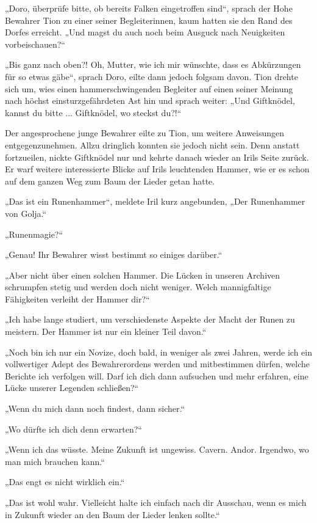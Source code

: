 „Doro, überprüfe bitte, ob bereits Falken eingetroffen sind“, sprach der Hohe Bewahrer Tion zu einer seiner Begleiterinnen, kaum hatten sie den Rand des Dorfes erreicht. „Und magst du auch noch beim Ausguck nach Neuigkeiten vorbeischauen?“

„Bis ganz nach oben?! Oh, Mutter, wie ich mir wünschte, dass es Abkürzungen für so etwas gäbe“, sprach Doro, eilte dann jedoch folgsam davon. Tion drehte sich um, wies einen hammerschwingenden Begleiter auf einen seiner Meinung nach höchst einsturzgefährdeten Ast hin und sprach weiter: „Und Giftknödel, kannst du bitte ... Giftknödel, wo steckst du?!“

Der angesprochene junge Bewahrer eilte zu Tion, um weitere Anweisungen entgegenzunehmen. Allzu dringlich konnten sie jedoch nicht sein. Denn anstatt fortzueilen, nickte Giftknödel nur und kehrte danach wieder an Irils Seite zurück. Er warf weitere interessierte Blicke auf Irils leuchtenden Hammer, wie er es schon auf dem ganzen Weg zum Baum der Lieder getan hatte.

„Das ist ein Runenhammer“, meldete Iril kurz angebunden, „Der Runenhammer von Golja.“

„Runenmagie?“

„Genau! Ihr Bewahrer wisst bestimmt so einiges darüber.“

„Aber nicht über einen solchen Hammer. Die Lücken in unseren Archiven schrumpfen stetig und werden doch nicht weniger. Welch mannigfaltige Fähigkeiten verleiht der Hammer dir?“

„Ich habe lange studiert, um verschiedenste Aspekte der Macht der Runen zu meistern. Der Hammer ist nur ein kleiner Teil davon.“

„Noch bin ich nur ein Novize, doch bald, in weniger als zwei Jahren, werde ich ein vollwertiger Adept des Bewahrerordens werden und mitbestimmen dürfen, welche Berichte ich verfolgen will. Darf ich dich dann aufsuchen und mehr erfahren, eine Lücke unserer Legenden schließen?“

„Wenn du mich dann noch findest, dann sicher.“

„Wo dürfte ich dich denn erwarten?“

„Wenn ich das wüsste. Meine Zukunft ist ungewiss. Cavern. Andor. Irgendwo, wo man mich brauchen kann.“

„Das engt es nicht wirklich ein.“

„Das ist wohl wahr. Vielleicht halte ich einfach nach dir Ausschau, wenn es mich in Zukunft wieder an den Baum der Lieder lenken sollte.“

